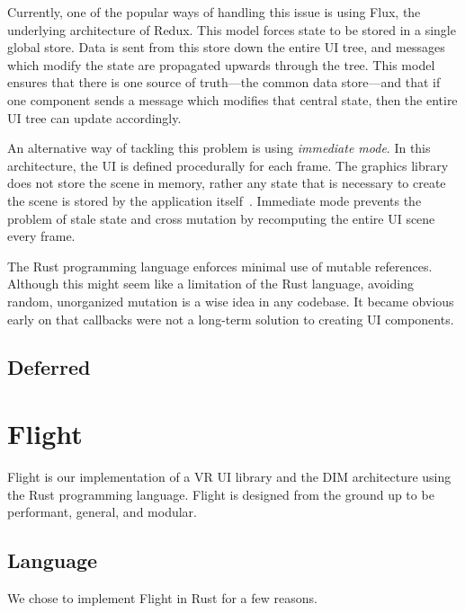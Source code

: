 \documentclass[conference,12pt]{IEEEtran}
\begin{document}
Currently, one of the popular ways of handling this issue is using Flux, the
underlying architecture of Redux. This model forces state to be stored in a
single global store. Data is sent from this store down the entire UI tree, and
messages which modify the state are propagated upwards through the tree. This
model ensures that there is one source of truth---the common data store---and
that if one component sends a message which modifies that central state, then
the entire UI tree can update accordingly.

An alternative way of tackling this problem is using \textit{immediate mode}.
In this architecture, the UI is defined procedurally for each frame. The
graphics library does not store the scene in memory, rather any state that is
necessary to create the scene is stored by the application
itself~\cite{Microsoft:Retained-vs-Immediate}. Immediate mode prevents the
problem of stale state and cross mutation by recomputing the entire UI scene
every frame.

The Rust programming language enforces minimal use of mutable references.
Although this might seem like a limitation of the Rust language, avoiding
random, unorganized mutation is a wise idea in any codebase. It became obvious
early on that callbacks were not a long-term solution to creating UI components.


\subsection{Deferred}

\section{Flight}\label{sec:flight}
Flight is our implementation of a VR UI library and the DIM architecture using
the Rust programming language. Flight is designed from the ground up to be
performant, general, and modular.

\subsection{Language}
We chose to implement Flight in Rust for a few reasons.
\end{document}
